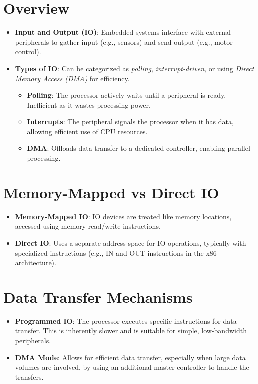 \documentclass[
  14pt,
  a4paper,
  DIV=11,
  numbers=noendperiod,
  headinclude=true,
  footinclude=true]{scrreprt}
\providecommand{\tightlist}{%
  \setlength{\itemsep}{0pt}\setlength{\parskip}{0pt}}\usepackage{longtable,booktabs,array}
\begin{document}
\section{Overview}\label{overview}

\begin{itemize}
\tightlist
\item
  \textbf{Input and Output (IO)}: Embedded systems interface with
  external peripherals to gather input (e.g., sensors) and send output
  (e.g., motor control).
\item
  \textbf{Types of IO}: Can be categorized as \emph{polling},
  \emph{interrupt-driven}, or using \emph{Direct Memory Access (DMA)}
  for efficiency.

  \begin{itemize}
  \tightlist
  \item
    \textbf{Polling}: The processor actively waits until a peripheral is
    ready. Inefficient as it wastes processing power.
  \item
    \textbf{Interrupts}: The peripheral signals the processor when it
    has data, allowing efficient use of CPU resources.
  \item
    \textbf{DMA}: Offloads data transfer to a dedicated controller,
    enabling parallel processing.
  \end{itemize}
\end{itemize}

\section{Memory-Mapped vs Direct IO}\label{memory-mapped-vs-direct-io}

\begin{itemize}
\tightlist
\item
  \textbf{Memory-Mapped IO}: IO devices are treated like memory
  locations, accessed using memory read/write instructions.
\item
  \textbf{Direct IO}: Uses a separate address space for IO operations,
  typically with specialized instructions (e.g., IN and OUT instructions
  in the x86 architecture).
\end{itemize}

\section{Data Transfer Mechanisms}\label{data-transfer-mechanisms}

\begin{itemize}
\tightlist
\item
  \textbf{Programmed IO}: The processor executes specific instructions
  for data transfer. This is inherently slower and is suitable for
  simple, low-bandwidth peripherals.
\item
  \textbf{DMA Mode}: Allows for efficient data transfer, especially when
  large data volumes are involved, by using an additional master
  controller to handle the transfers.
\end{itemize}
\end{document}
